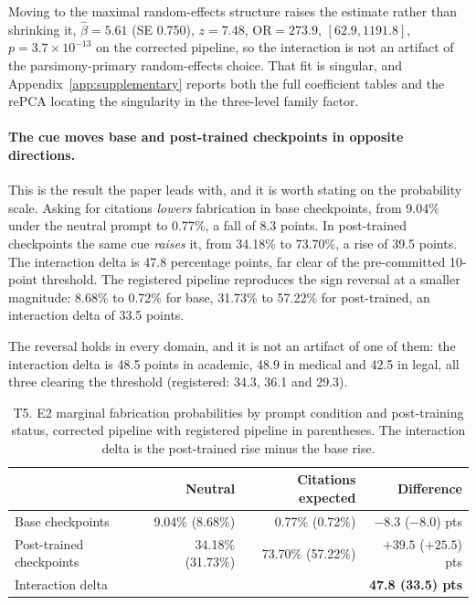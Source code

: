 Moving to the maximal random-effects structure raises the estimate rather than
shrinking it, $\hat\beta = 5.61$ (SE 0.750), $z = 7.48$, $\mathrm{OR} = 273.9$,
$[62.9, 1191.8]$, $p = 3.7 \times 10^{-13}$ on the corrected pipeline, so the
interaction is not an artifact of the parsimony-primary random-effects choice.
That fit is singular, and Appendix~\ref{app:supplementary} reports both the full
coefficient tables and the rePCA locating the singularity in the three-level
family factor.

\paragraph{The cue moves base and post-trained checkpoints in opposite directions.}
This is the result the paper leads with, and it is worth stating on the
probability scale. Asking for citations \emph{lowers} fabrication in base
checkpoints, from 9.04\% under the neutral prompt to 0.77\%, a fall of 8.3
points. In post-trained checkpoints the same cue \emph{raises} it, from 34.18\%
to 73.70\%, a rise of 39.5 points. The interaction delta is 47.8 percentage
points, far clear of the pre-committed 10-point threshold. The registered
pipeline reproduces the sign reversal at a smaller magnitude: 8.68\% to 0.72\%
for base, 31.73\% to 57.22\% for post-trained, an interaction delta of 33.5
points.

The reversal holds in every domain, and it is not an artifact of one of them:
the interaction delta is 48.5 points in academic, 48.9 in medical and 42.5 in
legal, all three clearing the threshold (registered: 34.3, 36.1 and 29.3).

\begin{table}[t]
\centering
\small
\caption{T5. E2 marginal fabrication probabilities by prompt condition and
post-training status, corrected pipeline with registered pipeline in
parentheses. The interaction delta is the post-trained rise minus the base
rise.}
\label{tab:t5}
\begin{tabular}{lrrr}
\toprule
 & Neutral & Citations expected & Difference \\
\midrule
Base checkpoints        & 9.04\% (8.68\%)  & 0.77\% (0.72\%)   & $-8.3$ ($-8.0$) pts \\
Post-trained checkpoints & 34.18\% (31.73\%) & 73.70\% (57.22\%) & $+39.5$ ($+25.5$) pts \\
\midrule
Interaction delta       &                  &                   & \textbf{47.8 (33.5) pts} \\
\bottomrule
\end{tabular}
\end{table}

